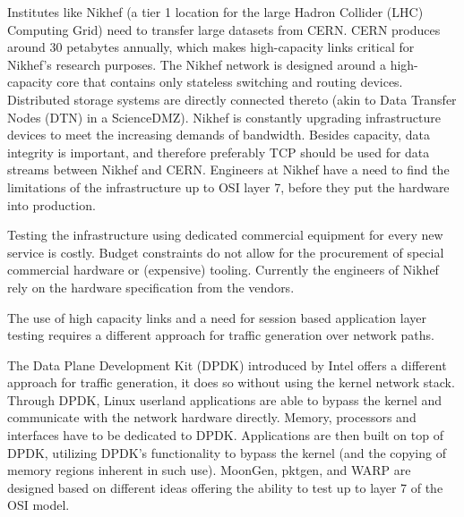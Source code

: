 Institutes like Nikhef (a tier 1 location for the large Hadron Collider (LHC) Computing Grid) need to transfer large datasets from CERN. 
CERN produces around 30 petabytes annually\cite{cerndata}, which makes high-capacity links critical for Nikhef's research purposes.
The Nikhef network is designed around a high-capacity core that contains only stateless switching and routing devices. 
Distributed storage systems are directly connected thereto (akin to Data Transfer Nodes (DTN) in a ScienceDMZ\cite{sciencedmz}).
Nikhef is constantly upgrading infrastructure devices to meet the increasing demands of bandwidth. 
Besides capacity, data integrity is important, and therefore preferably TCP should be used for data streams between Nikhef and CERN. 
Engineers at Nikhef have a need to find the limitations of the infrastructure up to OSI layer 7, before they put the hardware into production. 

Testing the infrastructure using dedicated commercial equipment for every new service is costly.
Budget constraints do not allow for the procurement of special commercial hardware or (expensive) tooling. 
Currently the engineers of Nikhef rely on the hardware specification from the vendors. 

The use of high capacity links and a need for session based application layer testing requires a different approach for traffic generation over network paths.

The Data Plane Development Kit\cite{dpdk} (DPDK) introduced by Intel offers a different approach for traffic generation, it does so without using the kernel network stack.  
Through DPDK, Linux userland applications are able to bypass the kernel and communicate with the network hardware directly. Memory, processors and interfaces have to be dedicated to DPDK.
Applications are then built on top of DPDK, utilizing DPDK's functionality to bypass the kernel (and the copying of memory regions inherent in such use). 
MoonGen\cite{moongen}, pktgen\cite{pktgen-dpdk}, and WARP\cite{warp} are designed based on different ideas offering the ability to test up to layer 7 of the OSI model.


